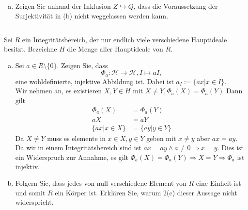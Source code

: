 \documentclass{article}
\begin{document}
\begin{enumerate}[(a)]
\begin{itemize}
\begin{itemize}
                        \begin{align*}
                            \underset{x',\in I,s'\in R}\exists\varphi(x')=x\land\varphi(s')=s
                            \Rightarrow s\cdot x=\varphi(s')\cdot\varphi(x')=\varphi(\underbrace{s'\cdot x'}_{\in I})
                            \in\varphi(I)
                        \end{align*}
                \end{itemize}
        \end{itemize}
    \item
        \color{blue}
        Zeigen Sie anhand der Inklusion $Z\hookrightarrow Q$, dass die Voraussetzung der Surjektivität in
        (b) nicht weggelassen werden kann.\\
        \color{black}
\end{enumerate}
\subsection{}
\color{blue}
Sei $R$ ein Integritätsbereich, der nur endlich viele verschiedene Hauptideale besitzt. Bezeichne
$H$ die Menge aller Hauptideale von $R$.
\color{black}
\begin{enumerate}[(a)]
    \item
        \color{blue}
        Sei $a\in R\setminus\{0\}$. Zeigen Sie, dass
        \begin{equation*}
        \Phi_a : \mathcal H\to\mathcal H, I\mapsto aI,
        \end{equation*}
        eine wohldefinierte, injektive Abbildung ist. Dabei ist $a_I:=\{ax|x\in I\}$.\\
        \color{black}
        Wir nehmen an, es existieren $X,Y\in H$ mit $X\neq Y,\Phi_a(X)=\Phi_a(Y)$
        Dann gilt
        \begin{align*}
            \Phi_a(X)&=\Phi_a(Y)\\
            aX&=aY\\
            \{ax|x\in X\}&=\{ay|y\in Y\}
        \end{align*}
        Da $X\neq Y$ muss es elemente in $x\in X,y\in Y$ geben mit $x\neq y$ aber $ax=ay$.
        Da wir in einem Integritätsbereich sind ist $ax=ay\land a\neq 0\Rightarrow x=y$.
        Dies ist ein Widerspruch zur Annahme, es gilt $\Phi_a(X)=\Phi_a(Y)\Rightarrow X=Y\Rightarrow\Phi_a$
        ist injektiv.
    \item
        \color{blue}
        Folgern Sie, dass jedes von null verschiedene Element von $R$ eine Einheit ist und
        somit $R$ ein Körper ist. Erklären Sie, warum 2(c) dieser Aussage nicht widerspricht.\\
        \color{black}
\end{enumerate}
\end{document}
